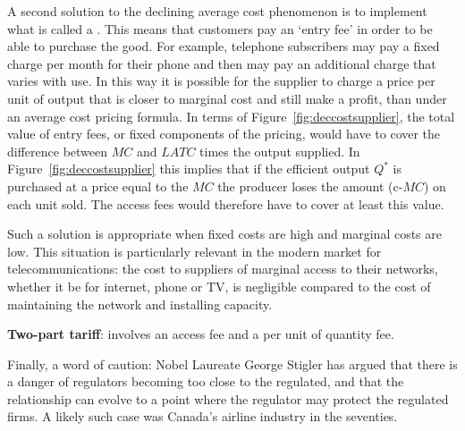 A second solution to the declining average cost phenomenon is to implement what is called a . This means that customers pay an `entry fee' in order to be able to purchase the good. For example, telephone subscribers may pay a fixed charge per month for their phone and then may pay an additional charge that varies with use. In this way it is possible for the supplier to charge a price per unit of output that is closer to marginal cost and still make a profit, than under an average cost pricing formula. In terms of Figure~\ref{fig:deccostsupplier}, the total value of entry fees, or fixed components of the pricing, would have to cover the difference between $MC$ and $LATC$ times the output supplied. In Figure~\ref{fig:deccostsupplier} this implies that if the efficient output $Q^*$ is purchased at a price equal to the $MC$ the producer loses the amount (c-$MC$) on each unit sold. The access fees would therefore have to cover at least this value.

Such a solution is appropriate when fixed costs are high and marginal costs are low. This situation is particularly relevant in the modern market for telecommunications: the cost to suppliers of marginal access to their networks, whether it be for internet, phone or TV, is negligible compared to the cost of maintaining the network and installing capacity.

\begin{DefBox}
\textbf{Two-part tariff}: involves an access fee and a per unit of quantity fee.
\end{DefBox}

Finally, a word of caution: Nobel Laureate George Stigler has argued that there is a danger of regulators becoming too close to the regulated, and that the relationship can evolve to a point where the regulator may protect the regulated firms. A likely such case was Canada's airline industry in the seventies.  